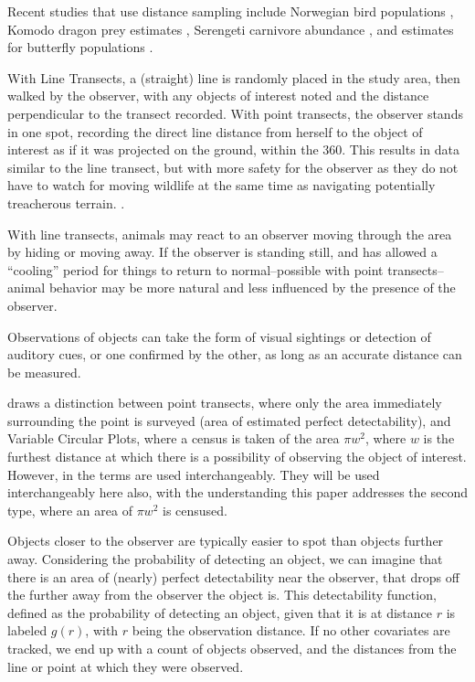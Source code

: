 \documentclass[12pt]{article}
\begin{document}
Recent studies that use distance sampling include Norwegian bird populations \parencite{pedersen2012}, Komodo dragon prey estimates \parencite{komodo2013}, Serengeti carnivore abundance \parencite{serengeti2011}, and estimates for butterfly populations \parencite{butterfly2011}. 

With Line Transects, a (straight) line is randomly placed in the study area, then walked by the observer, with any objects of interest noted and the distance perpendicular to the transect recorded. With point transects, the observer stands in one spot, recording the direct line distance from herself to the object of interest as if it was projected on the ground, within the 360\textdegree. This results in data similar to the line transect, but with more safety for the observer as they do not have to watch for moving wildlife at the same time as navigating potentially treacherous terrain. \cite{ramsey1979}.

With line transects, animals may react to an observer moving through the area by hiding or moving away. If the observer is standing still, and has allowed a ``cooling'' period for things to return to normal--possible with point transects--animal behavior may be more natural and less influenced by the presence of the observer.

Observations of objects can take the form of visual sightings or detection of auditory cues, or one confirmed by the other, as long as an accurate distance can be measured.

\textcite{buckland2001} draws a distinction between point transects, where only the area immediately surrounding the point is surveyed (area of estimated perfect detectability), and Variable Circular Plots, where a census is taken of the area $\pi w^2$, where $w$ is the furthest distance at which there is a possibility of observing the object of interest. However, in \textcite{buckland2006, quang1993} the terms are used interchangeably. They will be used interchangeably here also, with the understanding this paper addresses the second type, where an area of $\pi w^2$ is censused.

Objects closer to the observer are typically easier to spot than objects further away. Considering the probability of detecting an object, we can imagine that there is an area of (nearly) perfect detectability near the observer, that drops off the further away from the observer the object is. This detectability function, defined as the probability of detecting an object, given that it is at distance $r$ is labeled $g(r)$, with $r$ being the observation distance. If no other covariates are tracked, we end up with a count of objects observed, and the distances from the line or point at which they were observed.
\end{document}
